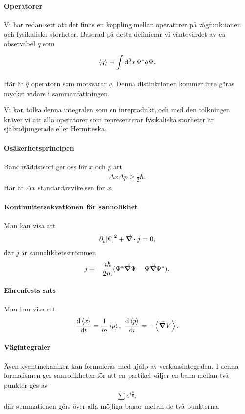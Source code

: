 \paragraph{Operatorer}
Vi har redan sett att det finns en koppling mellan operatorer på vågfunktionen och fysikaliska storheter. Baserad på detta definierar vi väntevärdet av en observabel $q$ som
\begin{align*}
	\expval{q} = \int\limits_{}^{}\dd[3]{x}\Psi^{*}\hat{q}\Psi.
\end{align*}
Här är $\hat{q}$ operatorn som motsvarar $q$. Denna distinktionen kommer inte göras mycket vidare i sammanfattningen.

Vi kan tolka denna integralen som en inreprodukt, och med den tolkningen kräver vi att alla operatorer som representerar fysikaliska storheter är självadjungerade eller Hermiteska.

\paragraph{Osäkerhetsprincipen}
Bandbräddsteori ger oss för $x$ och $p$ att
\begin{align*}
	\Delta x\Delta p \geq \frac{1}{2}\hbar.
\end{align*}
Här är $\Delta x$ standardavvikelsen för $x$.

\paragraph{Kontinuitetsekvationen för sannolikhet}
Man kan visa att
\begin{align*}
	\partial_{t}^{}\abs{\Psi}^{2} + \div{j} = 0,
\end{align*}
där $j$ är sannolikhetsströmmen
\begin{align*}
	j = -\frac{i\hbar}{2m}(\Psi^{*}\grad{\Psi} - \Psi\grad{\Psi^{*}}).
\end{align*}

\paragraph{Ehrenfests sats}
Man kan visa att
\begin{align*}
	\dv{\expval{x}}{t} = \frac{1}{m}\expval{p},\ \dv{\expval{p}}{t} = -\expval{\grad{V}}.
\end{align*}

\paragraph{Vägintegraler}
Även kvantmekaniken kan formuleras med hjälp av verkansintegralen. I denna formalismen ger sannolikheten för att en partikel väljer en bana mellan två punkter ges av
\begin{align*}
	\sum e^{i\frac{S}{\hbar}},
\end{align*}
där summationen görs över alla möjliga banor mellan de två punkterna.

